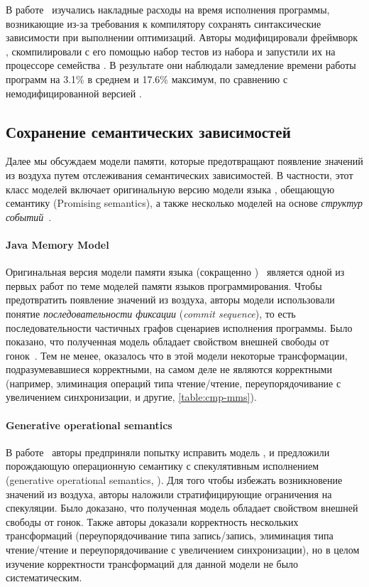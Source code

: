 В работе~\cite{Ou-Demsky:OOPSLA18} изучались накладные расходы
на время исполнения программы, возникающие из-за требования 
к компилятору сохранять синтаксические зависимости при выполнении оптимизаций. 
Авторы модифицировали фреймворк \LLVM, скомпилировали с его помощью 
набор тестов из набора \SPECCPU и запустили их на процессоре семейства .
В результате они наблюдали замедление времени работы программ 
на 3.1\% в среднем и 17.6\% максимум, по сравнению с немодифицированной версией \LLVM.  

\subsection{Сохранение семантических зависимостей}
\label{sec:catalog:sdeprf}

Далее мы обсуждаем модели памяти, 
которые предотвращают появление значений из воздуха 
путем отслеживания семантических зависимостей. 
В частности, этот класс моделей включает оригинальную 
версию модели языка \Java, обещающую семантику (Promising semantics), 
а также несколько моделей на основе \emph{структур событий}~\cite{Winskel:86}. 

\paragraph{Java Memory Model}
\label{sec:catalog:jmm}

Оригинальная версия модели памяти языка \Java (сокращенно \JMM)~\cite{Manson-al:POPL05}
является одной из первых работ по теме моделей памяти языков программирования.
Чтобы предотвратить появление значений из воздуха, 
авторы модели использовали понятие 
\emph{последовательности фиксации} (\emph{commit sequence}), 
то есть последовательности частичных графов сценариев исполнения программы. 
Было показано, что полученная модель обладает 
свойством внешней свободы от гонок~\cite{Huisman-Petri:CONCUR07}.
Тем не менее, оказалось что в этой модели
некоторые трансформации, подразумевавшиеся корректными, 
на самом деле не являются корректными~\cite{Sevcik-Aspinall:ECOOP08}
(например, элиминация операций типа чтение/чтение, 
переупорядочивание с увеличением синхронизации, и другие, \see \cref{table:cmp-mms}). 

\paragraph{Generative operational semantics}

В работе~\cite{Jagadeesan-al:ESOP10} авторы предприняли попытку исправить модель \JMM,
и предложили порождающую операционную семантику с спекулятивным исполнением
(generative operational semantics, \GOS).
Для того чтобы избежать возникновение значений из воздуха, 
авторы наложили стратифицирующие ограничения на спекуляции. 
Было доказано, что полученная модель обладает свойством 
внешней свободы от гонок. 
Также авторы доказали корректность нескольких трансформаций
(переупорядочивание типа запись/запись, 
элиминация типа чтение/чтение и переупорядочивание с увеличением синхронизации), 
но в целом изучение корректности трансформаций для данной модели не было систематическим. 

